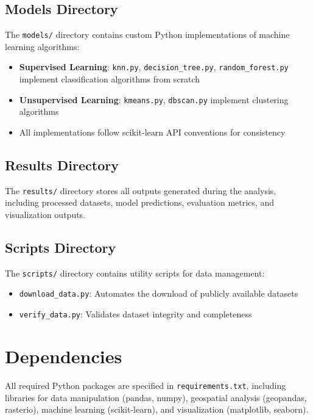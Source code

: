\subsection*{Models Directory}
The \texttt{models/} directory contains custom Python implementations of machine learning algorithms:

\begin{itemize}
    \item \textbf{Supervised Learning}: \texttt{knn.py}, \texttt{decision\_tree.py}, \texttt{random\_forest.py} implement classification algorithms from scratch
    \item \textbf{Unsupervised Learning}: \texttt{kmeans.py}, \texttt{dbscan.py} implement clustering algorithms
    \item All implementations follow scikit-learn API conventions for consistency
\end{itemize}

\subsection*{Results Directory}
The \texttt{results/} directory stores all outputs generated during the analysis, including processed datasets, model predictions, evaluation metrics, and visualization outputs.

\subsection*{Scripts Directory}
The \texttt{scripts/} directory contains utility scripts for data management:

\begin{itemize}
    \item \texttt{download\_data.py}: Automates the download of publicly available datasets
    \item \texttt{verify\_data.py}: Validates dataset integrity and completeness
\end{itemize}

\section*{Dependencies}
All required Python packages are specified in \texttt{requirements.txt}, including libraries for data manipulation (pandas, numpy), geospatial analysis (geopandas, rasterio), machine learning (scikit-learn), and visualization (matplotlib, seaborn).